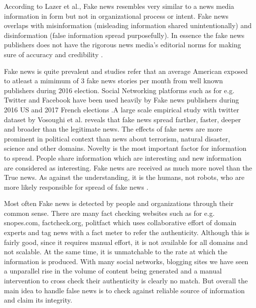 \documentclass[a4paper, 11pt]{article}
\begin{document}
According to Lazer et al., Fake news resembles very similar to a news media information in form but not in organizational process or intent. Fake news overlaps with misinformation (misleading information shared unintentionally) and disinformation (false information spread purposefully). In essence the fake news publishers does not have the rigorous news media's editorial norms for making sure of accuracy and credibility \cite{Lazer1094}. 

Fake news is quite prevalent and studies refer that an average American exposed to atleast a mimimum of 3 fake news stories per month from well known publishers during 2016 election. Social Networking platforms such as for e.g. Twitter and Facebook have been used heavily by Fake news publishers during 2016 US and 2017 French elections \cite{Lazer1094}.A large scale empirical study with twitter dataset by Vosoughi et al. reveals that fake news spread farther, faster, deeper and broader than the legitimate news. The effects of fake news are more prominent in political context than news about terrorism, natural disaster, science and other domains. Novelty is the most important factor for information to spread. People share information which are interesting and new information are considered as interesting. Fake news are received as much more novel than the True news. As against the understanding, it is the humans, not robots, who are more likely responsible for spread of fake news \cite{Vosoughi1146}.

Most often Fake news is detected by people and organizations through their common sense. There are many fact checking websites such as for e.g. snopes.com, factcheck.org, politfact which uses collaborative effort of domain experts and tag news with a fact meter to refer the authenticity. Although this is fairly good, since it requires manual effort, it is not available for all domains and not scalable. At the same time, it is unmatchable to the rate at which the information is produced. With many social networks, blogging sites we have seen a unparallel rise in the volume of content being generated and a manual intervention to cross check their authenticity is clearly no match. But overall the main idea to handle false news is to check against reliable source of information and claim its integrity.
\end{document}
